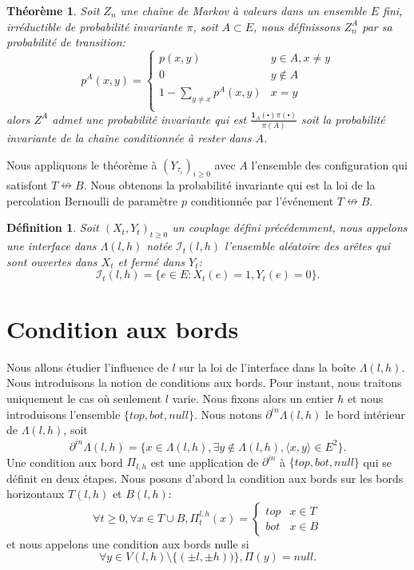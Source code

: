 \documentclass[titlepage,a4paper,12pt]{article}
\newcounter{def}
\newcounter{thm}
\newtheorem{interface}[def]{Définition}
\newtheorem{probainv}[thm]{Théorème}
\begin{document}
\begin{probainv}
Soit $Z_n$ une chaîne de Markov à valeurs dans un ensemble $E$ fini, irréductible de probabilité invariante $\pi$, soit $A\subset E$, nous définissons $Z_n^A$ par sa probabilité de transition:
$$p^A(x,y)=\left\lbrace \begin{array}{cc}
p(x,y) & y\in A, x\neq y \\
0 & y\notin A \\
1-\sum_{y\neq x}p^A(x,y) & x = y\\
\end{array}
\right.
$$
alors $Z^A$ admet une probabilité invariante qui est $\frac{\mathbf{1}_A(\centerdot)\pi(\centerdot)}{\pi(A)}$ soit la probabilité invariante de la chaîne conditionnée à rester dans $A$.
\end{probainv}

Nous appliquons le théorème à $(Y_{\tau_i})_{i\geqslant 0}$ avec $A$ l'ensemble des configuration qui satisfont $T\nleftrightarrow B$. Nous obtenons la probabilité invariante qui est la loi de la percolation Bernoulli de paramètre $p$ conditionnée par l'événement $T\nleftrightarrow B$.

\begin{interface}
Soit $(X_t,Y_t)_{t\geqslant 0}$ un couplage défini précédemment, nous appelons une interface dans $\Lambda({l,h})$ notée $\mathcal{I}_t({l,h})$ l'ensemble aléatoire des arêtes qui sont ouvertes dans $X_t$ et fermé dans $Y_t$: $$ \mathcal{I}_t({l,h}) = \big\{ e\in E: X_t(e) = 1, Y_t(e) = 0 \big\}.
$$
\end{interface}
\section{Condition aux bords}
Nous allons étudier l'influence de $l$ sur la loi de l'interface dans la boîte $\Lambda(l,h)$. Nous introduisons la notion de conditions aux bords. Pour instant, nous traitons uniquement le cas où seulement $l$ varie. Nous fixons alors un entier $h$ et nous introduisons l'ensemble $\{top,bot,null\}$. Nous notons $\partial^{in}\Lambda(l,h)$ le bord intérieur de $\Lambda(l,h)$, soit
$$ \partial^{in}\Lambda(l,h) = \{x\in \Lambda(l,h), \exists y \notin \Lambda(l,h), \langle x,y\rangle\in E^2\}.
$$
Une condition aux bord $\Pi_{l,h}$ est une application de $\partial^{in}$ à $\{top,bot,null\}$ qui se définit en deux étapes.
Nous posons d'abord la condition aux bords sur les bords horizontaux $T(l,h)$ et $B(l,h)$:
$$ \forall t\geqslant 0, \forall x\in T\cup B, \Pi_t^{l,h}(x) = \left\lbrace \begin{array}{ll}
top & x\in T\\
bot & x\in B
\end{array}
\right.
$$ et nous appelons une condition aux bords nulle si
$$\forall y\in V(l,h)\setminus \{(\pm l,\pm h))\}, \Pi(y) = null.
$$
\end{document}

